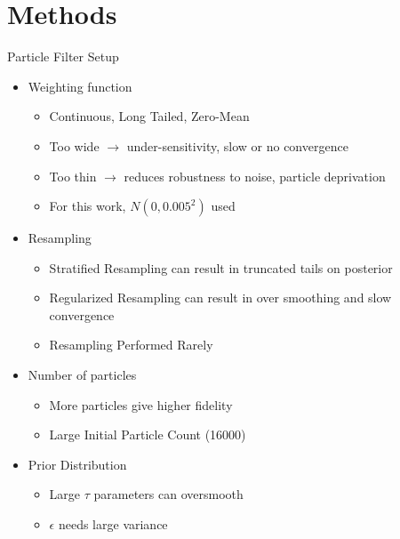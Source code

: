 \documentclass{beamer}
\begin{document}
\section{Methods}
\begin{frame}{Particle Filter Setup}
\footnotesize
\begin{itemize}
    \item Weighting function
        \begin{itemize}
            \item Continuous, Long Tailed, Zero-Mean 
            \item Too wide $\rightarrow$ under-sensitivity, 
                slow or no convergence
            \item Too thin $\rightarrow$ reduces robustness 
                to noise, particle deprivation
            \item For this work, $N(0, 0.005^2)$ used
        \end{itemize}
    \item Resampling 
        \begin{itemize}
            \item Stratified Resampling can result in truncated tails 
                    on posterior
            \item Regularized Resampling can result in over smoothing and 
                    slow convergence
            \item Resampling Performed Rarely
        \end{itemize}
    \item Number of particles
        \begin{itemize}
            \item More particles give higher fidelity 
            \item Large Initial Particle Count (16000)
        \end{itemize}
    \item Prior Distribution
    \begin{itemize}
            \item Large $\tau$ parameters can oversmooth
            \item $\epsilon$ needs large variance
    \end{itemize}
\end{itemize}
\end{frame}
\end{document}
